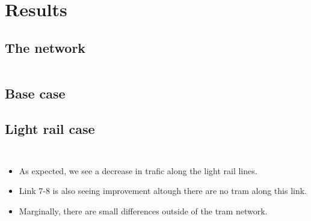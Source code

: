 \documentclass{EESD}
\begin{document}

\section{Results}

\subsection{The network}
\begin{frame}{}
\begin{columns}
	\centering
	\resizebox{!}{\textheight}{}

	\centering
	\resizebox{!}{\textheight}{}
\end{columns}
\end{frame}

\subsection{Base case}
\begin{frame}
	\centering
	\resizebox{!}{\textheight}{}
\end{frame}

\subsection{Light rail case}
\begin{frame}{}
\begin{columns}
	\centering
	\resizebox{!}{\textheight}{}

	\centering
	\resizebox{!}{\textheight}{}
\end{columns}
\end{frame}


\begin{frame}{}
\begin{columns}
	\centering
	\resizebox{!}{\textheight}{}
	\begin{itemize}
		\item As expected, we see a decrease in trafic along the light rail lines.
		\item Link 7-8 is also seeing improvement altough there are no tram along this link.
		\item Marginally, there are small differences outside of the tram network.
	\end{itemize}
\end{columns}
\end{frame}
\end{document}
